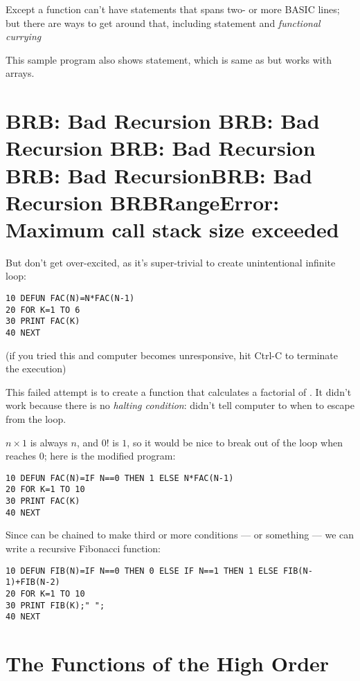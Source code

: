 Except a function can't have statements that spans two- or more BASIC lines; but there are ways to get around that, including  statement and \emph{functional currying}\setcounter{curryingappearance}{\value{page}}

This sample program also shows  statement, which is same as  but works with arrays.

\section[Recursion]{BRB: Bad Recursion BRB: Bad Recursion BRB: Bad Recursion BRB: Bad RecursionBRB: Bad Recursion BRBRangeError: Maximum call stack size exceeded}

But don't get over-excited, as it's super-trivial to create unintentional infinite loop:

\begin{lstlisting}
10 DEFUN FAC(N)=N*FAC(N-1)
20 FOR K=1 TO 6
30 PRINT FAC(K)
40 NEXT
\end{lstlisting}

(if you tried this and computer becomes unresponsive, hit Ctrl-C to terminate the execution)

This failed attempt is to create a function that calculates a factorial of . It didn't work because there is no \emph{halting condition}: didn't tell computer to when to escape from the loop.

$n \times 1$ is always $n$, and $0!$ is $1$, so it would be nice to break out of the loop when  reaches $0$; here is the modified program:

\begin{lstlisting}
10 DEFUN FAC(N)=IF N==0 THEN 1 ELSE N*FAC(N-1)
20 FOR K=1 TO 10
30 PRINT FAC(K)
40 NEXT
\end{lstlisting}

Since  can be chained to make third or more conditions ---  or something --- we can write a recursive Fibonacci function:

\begin{lstlisting}
10 DEFUN FIB(N)=IF N==0 THEN 0 ELSE IF N==1 THEN 1 ELSE FIB(N-1)+FIB(N-2)
20 FOR K=1 TO 10
30 PRINT FIB(K);" ";
40 NEXT
\end{lstlisting}

\section[Higher-order Function]{The Functions of the High Order}

